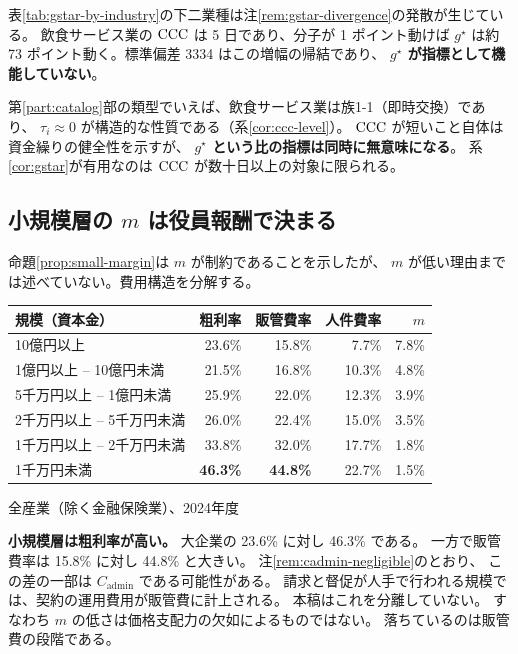 表\ref{tab:gstar-by-industry}の下二業種は注\ref{rem:gstar-divergence}の発散が生じている。
飲食サービス業の $\mathrm{CCC}$ は 5 日であり、分子が 1 ポイント動けば
$g^\star$ は約 73 ポイント動く。標準偏差 3334 はこの増幅の帰結であり、
\textbf{$g^\star$ が指標として機能していない}。

\begin{remark}
第\ref{part:catalog}部の類型でいえば、飲食サービス業は族1-1（即時交換）であり、
$\tau_i\approx 0$ が構造的な性質である（系\ref{cor:ccc-level}）。
$\mathrm{CCC}$ が短いこと自体は資金繰りの健全性を示すが、
\textbf{$g^\star$ という比の指標は同時に無意味になる}。
系\ref{cor:gstar}が有用なのは $\mathrm{CCC}$ が数十日以上の対象に限られる。
\end{remark}

\subsection{小規模層の \texorpdfstring{$m$}{m} は役員報酬で決まる}
\label{sec:officer-comp}

命題\ref{prop:small-margin}は $m$ が制約であることを示したが、
$m$ が低い理由までは述べていない。費用構造を分解する。

\begin{center}
\begin{tabular}{@{}lrrrr@{}}
\toprule
規模（資本金） & 粗利率 & 販管費率 & 人件費率 & $m$ \\
\midrule
10億円以上 & 23.6\% & 15.8\% & 7.7\% & 7.8\% \\
1億円以上 -- 10億円未満 & 21.5\% & 16.8\% & 10.3\% & 4.8\% \\
5千万円以上 -- 1億円未満 & 25.9\% & 22.0\% & 12.3\% & 3.9\% \\
2千万円以上 -- 5千万円未満 & 26.0\% & 22.4\% & 15.0\% & 3.5\% \\
1千万円以上 -- 2千万円未満 & 33.8\% & 32.0\% & 17.7\% & 1.8\% \\
1千万円未満 & \textbf{46.3\%} & \textbf{44.8\%} & 22.7\% & 1.5\% \\
\bottomrule
\end{tabular}
\label{tab:cost-structure-by-size}
\end{center}
\begin{center}\footnotesize 全産業（除く金融保険業）、2024年度\end{center}

\textbf{小規模層は粗利率が高い。} 大企業の 23.6\% に対し 46.3\% である。
一方で販管費率は 15.8\% に対し 44.8\% と大きい。
注\ref{rem:cadmin-negligible}のとおり、
この差の一部は $C_{\mathrm{admin}}$ である可能性がある。
請求と督促が人手で行われる規模では、契約の運用費用が販管費に計上される。
本稿はこれを分離していない。
すなわち $m$ の低さは価格支配力の欠如によるものではない。
落ちているのは販管費の段階である。

